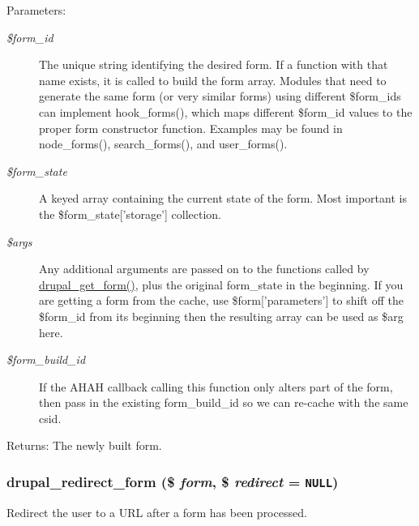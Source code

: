 \begin{Desc}
\item[Parameters:]
\begin{description}
\item[{\em \$form\_\-id}]The unique string identifying the desired form. If a function with that name exists, it is called to build the form array. Modules that need to generate the same form (or very similar forms) using different \$form\_\-ids can implement hook\_\-forms(), which maps different \$form\_\-id values to the proper form constructor function. Examples may be found in node\_\-forms(), search\_\-forms(), and user\_\-forms(). \item[{\em \$form\_\-state}]A keyed array containing the current state of the form. Most important is the \$form\_\-state\mbox{[}'storage'\mbox{]} collection. \item[{\em \$args}]Any additional arguments are passed on to the functions called by \hyperlink{group__form__api_g720df81a837b06dfe19daf1c1eea3437}{drupal\_\-get\_\-form()}, plus the original form\_\-state in the beginning. If you are getting a form from the cache, use \$form\mbox{[}'parameters'\mbox{]} to shift off the \$form\_\-id from its beginning then the resulting array can be used as \$arg here. \item[{\em \$form\_\-build\_\-id}]If the AHAH callback calling this function only alters part of the form, then pass in the existing form\_\-build\_\-id so we can re-cache with the same csid. \end{description}
\end{Desc}
\begin{Desc}
\item[Returns:]The newly built form. \end{Desc}
\hypertarget{group__form__api_gd2d616d098fbfd438466abe52136d660}{
\subsubsection[{drupal\_\-redirect\_\-form}]{\setlength{\rightskip}{0pt plus 5cm}drupal\_\-redirect\_\-form (\$ {\em form}, \/  \$ {\em redirect} = {\tt NULL})}}
\label{group__form__api_gd2d616d098fbfd438466abe52136d660}


Redirect the user to a URL after a form has been processed.


